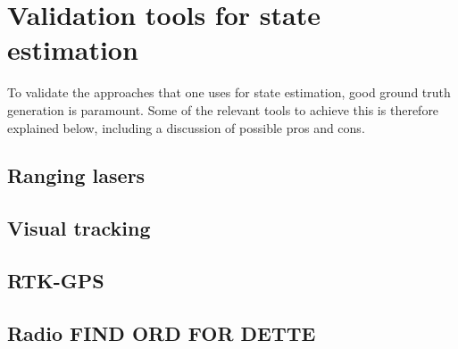 \section{Validation tools for state estimation}

To validate the approaches that one uses for state estimation, good ground truth generation is paramount. Some of the relevant tools to achieve this is therefore explained below, including a discussion of possible pros and cons.

\subsection{Ranging lasers}

\subsection{Visual tracking}

\subsection{RTK-GPS}

\subsection{Radio FIND ORD FOR DETTE}